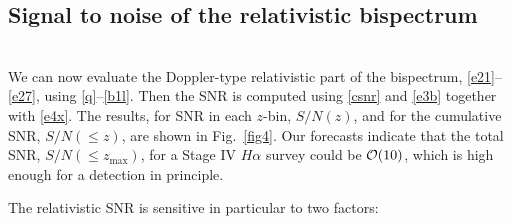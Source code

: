 \subsection{Signal to noise of the relativistic bispectrum}
~\\
We can now evaluate the Doppler-type relativistic part of the bispectrum, \eqref{e21}--\eqref{e27}, using \eqref{q}--\eqref {b1l}. 
Then the SNR is computed using  \eqref{csnr}  and \eqref{e3b} together with \eqref{e4x}.
The results, for SNR in each $z$-bin, $S/N(z)$, and for the cumulative SNR, $S/N(\leq z)$, are shown in Fig.~\ref{fig4}.
Our forecasts indicate that the total SNR, $S/N(\leq z_{\mathrm{max}})$, for a Stage IV $H\alpha$  survey could be ${\cal O}(10)$, which  is high enough for a detection in principle.

The relativistic SNR is sensitive in particular to two factors:
